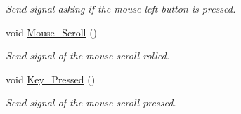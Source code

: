 \begin{DoxyCompactItemize}
\begin{DoxyCompactList}\small\item\em Send signal asking if the mouse left button is pressed. \end{DoxyCompactList}\item 
void \hyperlink{classQCustomLabel_aea283ddc963d921271109be3bcb82b6f}{Mouse\+\_\+\+Scroll} ()\hypertarget{classQCustomLabel_aea283ddc963d921271109be3bcb82b6f}{}\label{classQCustomLabel_aea283ddc963d921271109be3bcb82b6f}

\begin{DoxyCompactList}\small\item\em Send signal of the mouse scroll rolled. \end{DoxyCompactList}\item 
void \hyperlink{classQCustomLabel_a8c48808fd1d4287bf220df16f7c2feb5}{Key\+\_\+\+Pressed} ()\hypertarget{classQCustomLabel_a8c48808fd1d4287bf220df16f7c2feb5}{}\label{classQCustomLabel_a8c48808fd1d4287bf220df16f7c2feb5}

\begin{DoxyCompactList}\small\item\em Send signal of the mouse scroll pressed. \end{DoxyCompactList}\end{DoxyCompactItemize}
